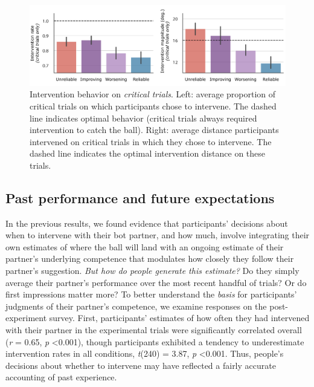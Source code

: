 \documentclass[10pt,letterpaper]{article}
\begin{document}
\begin{figure}[H]
\begin{center}
\includegraphics[width=\linewidth]{img/critical_trial_intervention_summary.pdf}
\end{center}
\caption{Intervention behavior on \textit{critical trials}. Left: average proportion of critical trials on which participants chose to intervene. The dashed line indicates optimal behavior (critical trials always required intervention to catch the ball). Right: average distance participants intervened on critical trials in which they chose to intervene. The dashed line indicates the optimal intervention distance on these trials.} 
\label{fig:critical_trials}
\end{figure}


\subsection{Past performance and future expectations}

In the previous results, we found evidence that participants' decisions about when to intervene with their bot partner, and how much, involve integrating their own estimates of where the ball will land with an ongoing estimate of their partner's underlying competence that modulates how closely they follow their partner's suggestion. \textit{But how do people generate this estimate?} Do they simply average their partner's performance over the most recent handful of trials? Or do first impressions matter more? To better understand the \textit{basis} for participants' judgments of their partner's competence, we examine responses on the post-experiment survey. First, participants' estimates of how often they had intervened with their partner in the experimental trials were significantly correlated overall (\textit{r} = 0.65, \textit{p} \textless{0.001}), though participants exhibited a tendency to underestimate intervention rates in all conditions, \textit{t}(240) = 3.87, \textit{p} \textless{0.001}. Thus, people's decisions about whether to intervene may have reflected a fairly accurate accounting of past experience. 
\end{document}
